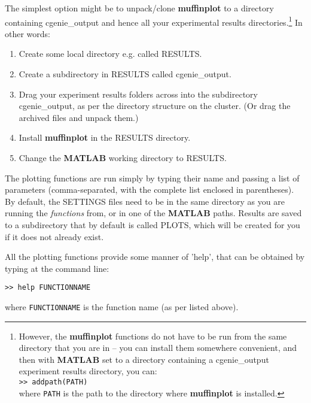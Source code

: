 \documentclass[11pt,fleqn]{book} %
\begin{document}
The simplest option might be to unpack/clone \textbf{muffinplot} to a directory containing \footnotesize\textsf{cgenie\_output }\normalsize and hence all your experimental results directories.\footnote{However, the \textbf{muffinplot} functions do not have to be run from the same directory that you are in -- you can install them somewhere convenient, and then with \textbf{MATLAB} set to a directory containing a \textsf{cgenie\_output} experiment results directory, you can:
\\\texttt{>> addpath(PATH)}
\\where \texttt{PATH} is the path to the directory where \textbf{muffinplot} is installed.}
In other words:
\begin{enumerate}[noitemsep]
\vspace{1mm}
\item Create some local directory e.g. called \footnotesize\textsf{RESULTS}\normalsize.
\vspace{1mm}
\item Create a subdirectory in \footnotesize\textsf{RESULTS }\normalsize called \footnotesize\textsf{cgenie\_output}\normalsize.
\vspace{1mm}
\item Drag your experiment results folders across into the subdirectory \footnotesize\textsf{cgenie\_output}\normalsize, as per the directory structure on the cluster. (Or drag the archived files and unpack them.)
\vspace{1mm}
\item Install \textbf{muffinplot} in the \footnotesize\textsf{RESULTS }\normalsize directory.
\vspace{1mm}
\item Change the \textbf{MATLAB} working directory to \footnotesize\textsf{RESULTS}\normalsize.
\end{enumerate}
\vspace{2mm}

The plotting functions are run simply by typing their name and passing a list of parameters (comma-separated, with the complete list enclosed in parentheses). By default,   the \footnotesize\textsf{SETTINGS }\normalsize files need to be in the same directory as you are running the \textit{functions} from, or in one of the \textbf{MATLAB} paths. Results are saved to a subdirectory that by default is called \footnotesize\textsf{PLOTS}\normalsize, which will be created for you if it does not already exist.

All the plotting functions provide some manner of 'help', that can be obtained by typing at the command line:
\vspace{-2pt}\begin{verbatim}
>> help FUNCTIONNAME
\end{verbatim}\vspace{-2pt}
where \texttt{FUNCTIONNAME} is the function name (as per listed above).
\end{document}
